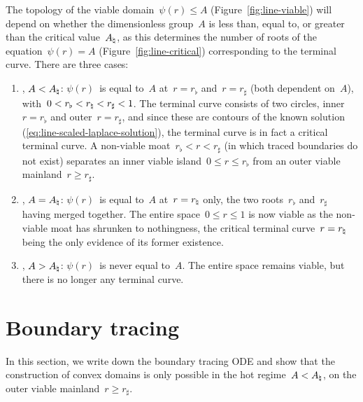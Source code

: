 The topology of the viable domain~$\psi (r) \le A$
(Figure~\ref{fig:line-viable})
will depend on whether the dimensionless group~$A$ is
less than, equal to, or greater than the critical value~$A_\natural$,
as this determines the number of roots of the equation~$\psi (r) = A$
(Figure~\ref{fig:line-critical})
corresponding to the terminal curve.
There are three cases:
\begin{enumerate}
  \item
  \label{itm:polar.regimes.hot}
    , $A < A_\natural$:
    $\psi (r)$~is equal to~$A$ at~$r = r_\flat$ and~$r = r_\sharp$
    (both dependent on~$A$),
    with~$0 <  r_\flat < r_\natural < r_\sharp < 1$.
    The terminal curve consists of two circles,
    inner~$r = r_\flat$ and outer~$r = r_\sharp$,
    and since these are contours of the known solution~%
      (\ref{eq:line-scaled-laplace-solution}),
    the terminal curve is in fact a critical terminal curve.
    A non-viable moat~$r_\flat < r < r_\sharp$
    (in which traced boundaries do not exist)
    separates an inner viable island~$0 \le r \le r_\flat$
    from an outer viable mainland~$r \ge r_\sharp$.
  \item
    , $A = A_\natural$:
    $\psi (r)$~is equal to~$A$ at~$r = r_\natural$ only,
    the two roots~$r_\flat$ and~$r_\sharp$ having merged together.
    The entire space~$0 \le r \le 1$ is now viable
    as the non-viable moat has shrunken to nothingness,
    the critical terminal curve~$r = r_\natural$
    being the only evidence of its former existence.
  \item
    , $A > A_\natural$:
    $\psi (r)$~is never equal to~$A$.
    The entire space remains viable,
    but there is no longer any terminal curve.
\end{enumerate}

\begin{figure}
\end{figure}

\section{Boundary tracing}
\label{sec:polar.tracing}

In this section, we write down the boundary tracing ODE
and show that the construction of convex domains
is only possible in the hot regime~$A < A_\natural$,
on the outer viable mainland~$r \ge r_\sharp$.


